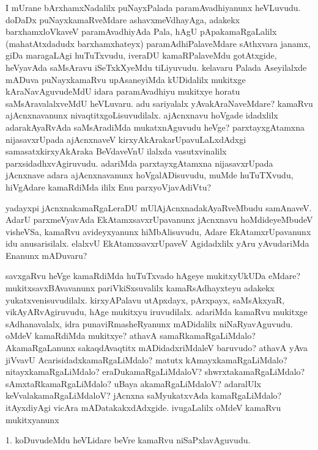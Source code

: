 \begin{artha}
I mUrane bArxhamxNadalilx puNayxPalada paramAvadhiyanunx heVLuvudu. doDaDx puNayxkamaRveMdare ashavxmeVdhayAga, adakekx barxhamxloVkaveV paramAvadhiyAda Pala, hAgU pApakamaRgaLalilx (mahatAtxdadudx barxhamxhateyx) paramAdhiPalaveMdare sAthxvara janamx, giDa maragaLAgi huTuTxvudu, iveraDU kamaRPalaveMdu gotAtxgide, heVyavAda saMsAravu iSeTxkXyeMdu tiLiyuvudu. kelavaru Palada Aseyilalxde mADuva puNayxkamaRvu upAsaneyiMda kUDidalilx mukitxge kAraNavAguvudeMdU idara paramAvadhiyu mukitxye horatu saMsAravalalxveMdU heVLuvaru. adu sariyalalx \ndash  yAvakAraNaveMdare? kamaRvu ajAcnxnavanunx nivaqtitxgoLisuvudilalx. ajAcnxnavu hoVgade idadxlilx adarakAyaRvAda saMsAradiMda mukatxnAguvudu heVge? parxtayxgAtamxna nijasavxrUpada ajAcnxnaveV kirxyAkArakarUpavuLaLxdAdxgi samasatxkirxyAkAraka BeVdaveVnU ilalxda vasutxvinalilx parxsidadhxvAgiruvudu. adariMda parxtayxgAtamxna nijasavxrUpada jAcnxnave adara ajAcnxnavanunx hoVgalADisuvudu, muMde huTuTXvudu, hiVgAdare kamaRdiMda ililx Enu parxyoVjavAdiVtu?

yadayxpi jAcnxnakamaRgaLeraDU mUlAjAcnxnadakAyaRveMbudu  samAnaveV. AdarU parxmeVyavAda EkAtamxsavxrUpavanunx jAcnxnavu hoMdideyeMbudeV visheVSa, kamaRvu avideyxyanunx hiMbAlisuvudu, Adare EkAtamxrUpavanunx idu anusarisilalx. elalxvU EkAtamxsavxrUpaveV Agidadxlilx yAru yAvudariMda Enanunx mADuvaru?
\end{artha}

\centerline{}

\begin{artha}
savxgaRvu heVge kamaRdiMda huTuTxvado hAgeye mukitxyUkUDa eMdare? mukitxsavxBAvavanunx pariVkiSxsuvalilx kamaRsAdhayxteyu adakekx yukatxvenisuvudilalx. kirxyAPalavu utApxdayx, pArxpayx, saMsAkxyaR, vikAyARvAgiruvudu, hAge mukitxyu iruvudilalx. adariMda kamaRvu mukitxge sAdhanavalalx, idra punaviRmasheRyanunx mADidalilx niNaRyavAguvudu. oMdeV kamaRdiMda mukitxye? athavA samaRkamaRgaLiMdalo? AkamaRgaLanunx sakaqdAvaqtitx mADidadxriMdaleV  baruvudo? athavA yAva jiVvavU AcarisidadxkamaRgaLiMdalo? matutx kAmayxkamaRgaLiMdalo? nitayxkamaRgaLiMdalo? eraDukamaRgaLiMdaloV? shwrxtakamaRgaLiMdalo? sAmxtaRkamaRgaLiMdalo? uBaya akamaRgaLiMdaloV? adaralUlx keVvalakamaRgaLiMdaloV? jAcnxna saMyukatxvAda kamaRgaLiMdalo? itAyxdiyAgi vicAra mADatakakxdAdxgide. ivugaLalilx oMdeV kamaRvu mukitxyanunx 
\end{artha}

\begin{artha}
1. koDuvudeMdu heVLidare beVre kamaRvu niSaPxlavAguvudu.
\end{artha}

